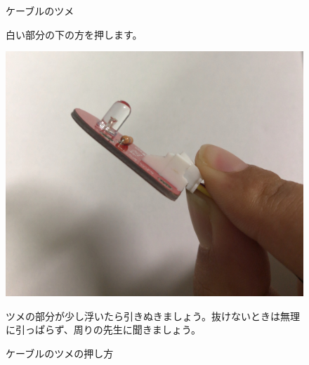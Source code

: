 \begin{enumerate}
\begin{figure}[H]
\begin{minipage}[t]{0.45\columnwidth}
      \caption{ケーブルのツメ}
      白い部分の下の方を押します。
    \end{minipage}
    \hspace{0.04\columnwidth} %
    \begin{minipage}[t]{0.45\columnwidth}
      \centering
      \includegraphics[width=.8\hsize]{images/chap05/text05-img011.jpg}
      \caption{ケーブルのツメの押し方}
      ツメの部分が少し浮いたら引きぬきましょう。抜けないときは無理に引っぱらず、周りの先生に聞きましょう。
    \end{minipage}
  \end{figure}
  \end{enumerate}


\begin{tcolorbox}[title=\useOmetoi]
\begin{enumerate}
\end{enumerate}
\end{tcolorbox}















